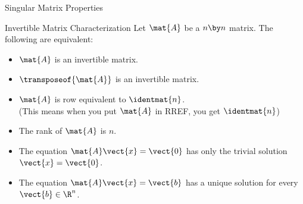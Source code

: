 \documentclass{beamer}
\begin{document}
\begin{frame}{Singular Matrix Properties}
\begin{block}{Invertible Matrix Characterization}
Let $\mat{A}$ be a $n \by n$ matrix. The following are equivalent:
\begin{itemize}
\item<+-> $\mat{A}$ is an invertible matrix.
\item<+-> $\transposeof{\mat{A}}$ is an invertible matrix.
\item<+-> $\mat{A}$ is row equivalent to $\identmat{n}$.\\ (This means when you put $\mat{A}$ in RREF, you get $\identmat{n}$)
\item<+-> The rank of $\mat{A}$ is $n$.
\item<+-> The equation $\mat{A}\vect{x}=\vect{0}$ has only the trivial solution $\vect{x}=\vect{0}$.
\item<+-> The equation $\mat{A}\vect{x}=\vect{b}$ has a unique solution for every $\vect{b}\in\R^n$.
\end{itemize}
\end{block}
\end{frame}
\end{document}
